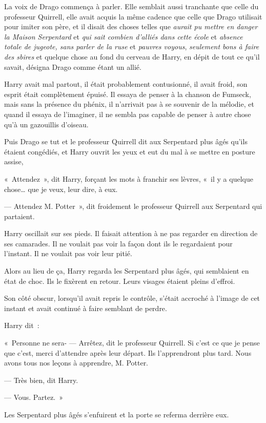 La voix de Drago commença à parler.
Elle semblait aussi tranchante que celle du professeur Quirrell, elle avait acquis la même cadence que celle que Drago utilisait pour imiter son père, et il disait des choses telles que \emph{aurait pu mettre en danger la Maison Serpentard} et \emph{qui sait combien d'alliés dans cette école} et \emph{absence totale de jugeote, sans parler de la ruse} et \emph{pauvres voyous}, \emph{seulement bons à faire des sbires} et quelque chose au fond du cerveau de Harry, en dépit de tout ce qu'il savait, désigna Drago comme étant un allié.

Harry avait mal partout, il était probablement contusionné, il avait froid, son esprit était complètement épuisé.
Il essaya de penser à la chanson de Fumseck, mais sans la présence du phénix, il n'arrivait pas à se souvenir de la mélodie, et quand il essaya de l'imaginer, il ne sembla pas capable de penser à autre chose qu'à un gazouillis d'oiseau.

Puis Drago se tut et le professeur Quirrell dit aux Serpentard plus âgés qu'ils étaient congédiés, et Harry ouvrit les yeux et eut du mal à se mettre en posture assise,

«~Attendez~», dit Harry, forçant les mots à franchir ses lèvres, «~il y a quelque chose… que je veux, leur dire, à eux.

--- Attendez M. Potter~», dit froidement le professeur Quirrell aux Serpentard qui partaient.

Harry oscillait sur ses pieds.
Il faisait attention à ne pas regarder en direction de ses camarades.
Il ne voulait pas voir la façon dont ils le regardaient pour l'instant.
Il ne voulait pas voir leur pitié.

Alors au lieu de ça, Harry regarda les Serpentard plus âgés, qui semblaient en état de choc.
Ils le fixèrent en retour.
Leurs visages étaient pleins d'effroi.

Son côté obscur, lorsqu'il avait repris le contrôle, s'était accroché à l'image de cet instant et avait continué à faire semblant de perdre.

Harry dit~:

«~Personne ne sera-
--- Arrêtez, dit le professeur Quirrell.
Si c'est ce que je pense que c'est, merci d'attendre après leur départ.
Ils l'apprendront plus tard.
Nous avons tous nos leçons à apprendre, M. Potter.

--- Très bien, dit Harry.

--- Vous.
Partez.~»

Les Serpentard plus âgés s'enfuirent et la porte se referma derrière eux.

